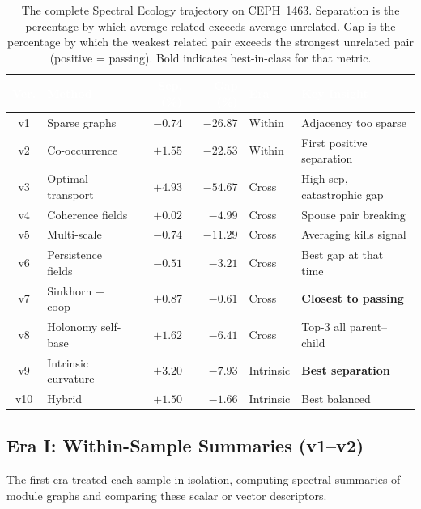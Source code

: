 \documentclass{../yalumba}
\begin{document}
\begin{table}[htbp]
\centering
\tablestyle
\caption{The complete Spectral Ecology trajectory on CEPH~1463.
Separation is the percentage by which average related exceeds average
unrelated.  Gap is the percentage by which the weakest related pair
exceeds the strongest unrelated pair (positive = passing).  Bold
indicates best-in-class for that metric.}
\label{tab:arc}
\small
\begin{tabular}{@{}clrrll@{}}
\toprule
\rowcolor{table-header}
\textcolor{white}{\textbf{Ver.}} &
\textcolor{white}{\textbf{Method}} &
\textcolor{white}{\textbf{Sep. (\%)}} &
\textcolor{white}{\textbf{Gap (\%)}} &
\textcolor{white}{\textbf{Era}} &
\textcolor{white}{\textbf{Key Insight}} \\
\midrule
v1 & Sparse graphs & $-0.74$ & $-26.87$ & Within & Adjacency too sparse \\
v2 & Co-occurrence & $+1.55$ & $-22.53$ & Within & First positive separation \\
\midrule
v3 & Optimal transport & $+4.93$ & $-54.67$ & Cross & High sep, catastrophic gap \\
v4 & Coherence fields & $+0.02$ & $-4.99$ & Cross & Spouse pair breaking \\
v5 & Multi-scale & $-0.74$ & $-11.29$ & Cross & Averaging kills signal \\
v6 & Persistence fields & $-0.51$ & $-3.21$ & Cross & Best gap at that time \\
v7 & Sinkhorn + coop & $+0.87$ & $\mathbf{-0.61}$ & Cross & \textbf{Closest to passing} \\
v8 & Holonomy self-base & $+1.62$ & $-6.41$ & Cross & Top-3 all parent--child \\
\midrule
v9 & Intrinsic curvature & $\mathbf{+3.20}$ & $-7.93$ & Intrinsic & \textbf{Best separation} \\
v10 & Hybrid & $+1.50$ & $-1.66$ & Intrinsic & Best balanced \\
\bottomrule
\end{tabular}
\end{table}

\subsection{Era I: Within-Sample Summaries (v1--v2)}

The first era treated each sample in isolation, computing spectral
summaries of module graphs and comparing these scalar or vector
descriptors.
\end{document}
